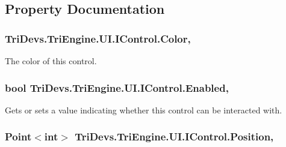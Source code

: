 \subsection{Property Documentation}
\hypertarget{interface_tri_devs_1_1_tri_engine_1_1_u_i_1_1_i_control_a5a63cf497f4b624eca7736b58fe0a730}{
\subsubsection[{Color}]{ Tri\-Devs.\-Tri\-Engine.\-U\-I.\-I\-Control.\-Color\hspace{0.3cm}{\ttfamily [get]}, {\ttfamily [set]}}}\label{interface_tri_devs_1_1_tri_engine_1_1_u_i_1_1_i_control_a5a63cf497f4b624eca7736b58fe0a730}


The color of this control. 

\hypertarget{interface_tri_devs_1_1_tri_engine_1_1_u_i_1_1_i_control_a85e871547da23b6f0a8c5d7fe25b16dc}{
\subsubsection[{Enabled}]{\setlength{\rightskip}{0pt plus 5cm}bool Tri\-Devs.\-Tri\-Engine.\-U\-I.\-I\-Control.\-Enabled\hspace{0.3cm}{\ttfamily [get]}, {\ttfamily [set]}}}\label{interface_tri_devs_1_1_tri_engine_1_1_u_i_1_1_i_control_a85e871547da23b6f0a8c5d7fe25b16dc}


Gets or sets a value indicating whether this control can be interacted with. 

\hypertarget{interface_tri_devs_1_1_tri_engine_1_1_u_i_1_1_i_control_a6c895318c35e72761e0d8b3a32965814}{
\subsubsection[{Position}]{\setlength{\rightskip}{0pt plus 5cm}Point$<$int$>$ Tri\-Devs.\-Tri\-Engine.\-U\-I.\-I\-Control.\-Position\hspace{0.3cm}{\ttfamily [get]}, {\ttfamily [set]}}}\label{interface_tri_devs_1_1_tri_engine_1_1_u_i_1_1_i_control_a6c895318c35e72761e0d8b3a32965814}


